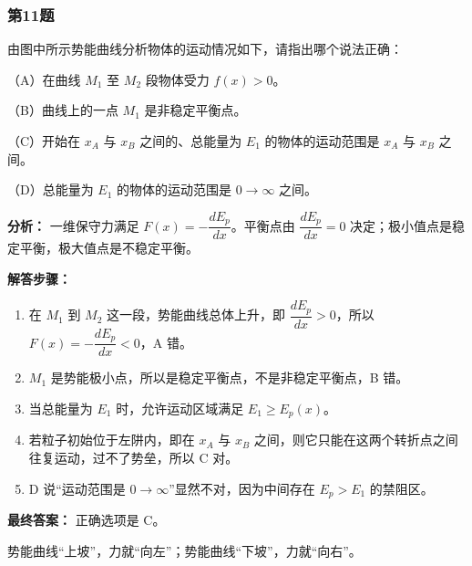 \documentclass[12pt,a4paper]{ctexart}
\begin{document}
\subsubsection*{第11题}
\begin{tcolorbox}[colback=gray!2!white,colframe=black!60,title={题目}]
由图中所示势能曲线分析物体的运动情况如下，请指出哪个说法正确：\par
（A）在曲线 \(M_1\) 至 \(M_2\) 段物体受力 \(f(x)>0\)。\par
（B）曲线上的一点 \(M_1\) 是非稳定平衡点。\par
（C）开始在 \(x_A\) 与 \(x_B\) 之间的、总能量为 \(E_1\) 的物体的运动范围是 \(x_A\) 与 \(x_B\) 之间。\par
（D）总能量为 \(E_1\) 的物体的运动范围是 \(0\to\infty\) 之间。\par
\end{tcolorbox}
\begin{tcolorbox}[colback=blue!2!white,colframe=blue!55!black,title={完整答案}]
\textbf{分析：}
一维保守力满足 \(F(x)=-\dfrac{dE_p}{dx}\)。平衡点由 \(\dfrac{dE_p}{dx}=0\) 决定；极小值点是稳定平衡，极大值点是不稳定平衡。\par
\textbf{解答步骤：}
\begin{enumerate}
\item 在 \(M_1\) 到 \(M_2\) 这一段，势能曲线总体上升，即 \(\dfrac{dE_p}{dx}>0\)，所以 \(F(x)=-\dfrac{dE_p}{dx}<0\)，A 错。
\item \(M_1\) 是势能极小点，所以是稳定平衡点，不是非稳定平衡点，B 错。
\item 当总能量为 \(E_1\) 时，允许运动区域满足 \(E_1\ge E_p(x)\)。
\item 若粒子初始位于左阱内，即在 \(x_A\) 与 \(x_B\) 之间，则它只能在这两个转折点之间往复运动，过不了势垒，所以 C 对。
\item D 说“运动范围是 \(0\to\infty\)”显然不对，因为中间存在 \(E_p>E_1\) 的禁阻区。
\end{enumerate}
\textbf{最终答案：}
正确选项是 C。\par
\end{tcolorbox}
\begin{tcolorbox}[colback=red!2!white,colframe=red!55!black,title={易错点}]
势能曲线“上坡”，力就“向左”；势能曲线“下坡”，力就“向右”。\par
\end{tcolorbox}
\end{document}
